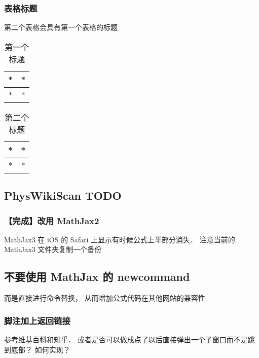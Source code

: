 \subsubsection{表格标题}
第二个表格会具有第一个表格的标题
\begin{table}[ht]
\centering
\caption{第一个标题}\label{edTODO_tab2}
\begin{tabular}{|c|c|}
\hline
* & * \\
\hline
* & * \\
\hline
\end{tabular}
\end{table}

\begin{table}[ht]
\centering
\caption{第二个标题}\label{edTODO_tab3}
\begin{tabular}{|c|c|}
\hline
* & * \\
\hline
* & * \\
\hline
\end{tabular}
\end{table}

\subsection{PhysWikiScan TODO}

\subsubsection{【完成】改用 MathJax2}
MathJax3 在 iOS 的 Safari 上显示有时候公式上半部分消失． 注意当前的 MathJax3 文件夹复制一个备份

\subsection{不要使用 MathJax 的 newcommand}
而是直接进行命令替换， 从而增加公式代码在其他网站的兼容性

\subsubsection{脚注加上返回链接}
参考维基百科和知乎． 或者是否可以做成点了以后直接弹出一个子窗口而不是跳到底部？ 如何实现？

